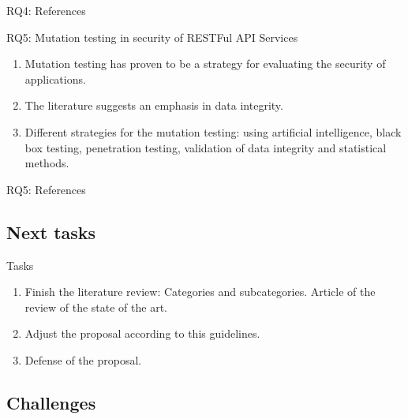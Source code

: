 \documentclass[10pt]{beamer}
\theoremstyle{remark}
\theoremstyle{definition}
\begin{document}
  \begin{frame}[allowframebreaks]{RQ4: References}
    \printbibliography[keyword={RQ4}]
  \end{frame}

  \begin{frame}{RQ5: Mutation testing in security of RESTFul API Services}
    \begin{enumerate}
      \item Mutation testing has proven to be a strategy for evaluating the security of applications.
      \item The literature suggests an emphasis in data integrity.
      \item Different strategies for the mutation testing: using artificial intelligence, black box testing, penetration testing, validation of data integrity and statistical methods.
    \end{enumerate}
  \end{frame}

  \begin{frame}[allowframebreaks]{RQ5: References}
   \printbibliography[keyword={RQ5}]
  \end{frame}

\subsection{Next tasks}

\begin{frame}{Tasks}
  \begin{enumerate}
    \item Finish the literature review: Categories and subcategories. Article of the review of the state of the art.
    \item Adjust the proposal according to this guidelines.
    \item Defense of the proposal.
  \end{enumerate}
\end{frame}

\subsection{Challenges}
\end{document}
